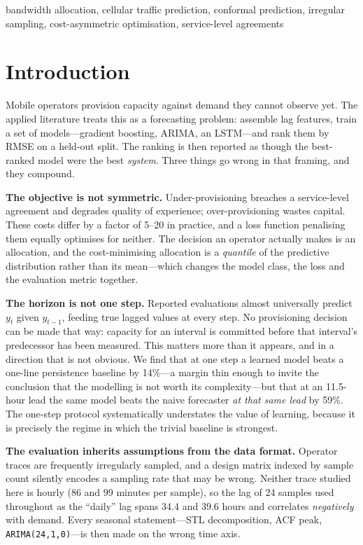\documentclass[conference]{IEEEtran}
\begin{document}
\begin{IEEEkeywords}
bandwidth allocation, cellular traffic prediction, conformal prediction, irregular
sampling, cost-asymmetric optimisation, service-level agreements
\end{IEEEkeywords}

\section{Introduction}

Mobile operators provision capacity against demand they cannot observe yet. The applied
literature treats this as a forecasting problem: assemble lag features, train a set of
models---gradient boosting, ARIMA, an LSTM---and rank them by RMSE on a held-out split.
The ranking is then reported as though the best-ranked model were the best
\emph{system}. Three things go wrong in that framing, and they compound.

\textbf{The objective is not symmetric.} Under-provisioning breaches a service-level
agreement and degrades quality of experience; over-provisioning wastes capital. These
costs differ by a factor of 5--20 in practice, and a loss function penalising them
equally optimises for neither. The decision an operator actually makes is an
allocation, and the cost-minimising allocation is a \emph{quantile} of the predictive
distribution rather than its mean---which changes the model class, the loss and the
evaluation metric together.

\textbf{The horizon is not one step.} Reported evaluations almost universally predict
$y_t$ given $y_{t-1}$, feeding true lagged values at every step. No provisioning
decision can be made that way: capacity for an interval is committed before that
interval's predecessor has been measured. This matters more than it appears, and in a
direction that is not obvious. We find that at one step a learned model beats a
one-line persistence baseline by 14\%---a margin thin enough to invite the conclusion
that the modelling is not worth its complexity---but that at an 11.5-hour lead the same
model beats the naive forecaster \emph{at that same lead} by 59\%. The one-step
protocol systematically understates the value of learning, because it is precisely the
regime in which the trivial baseline is strongest.

\textbf{The evaluation inherits assumptions from the data format.} Operator traces are
frequently irregularly sampled, and a design matrix indexed by sample count silently
encodes a sampling rate that may be wrong. Neither trace studied here is hourly (86 and
99 minutes per sample), so the lag of 24 samples used throughout as the ``daily'' lag
spans 34.4 and 39.6 hours and correlates \emph{negatively} with demand. Every seasonal
statement---STL decomposition, ACF peak, \texttt{ARIMA(24,1,0)}---is then made on the
wrong time axis.
\end{document}
